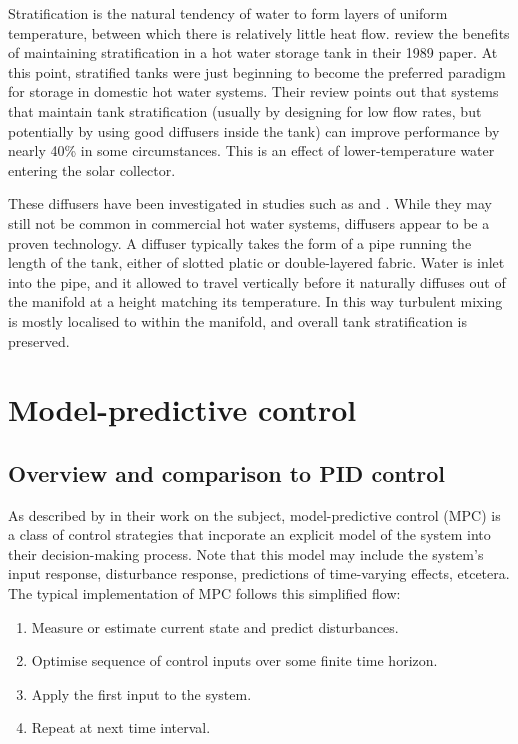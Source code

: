 Stratification is the natural tendency of water to form layers of uniform temperature, between which there is relatively little heat flow.
\textcite{Hollands89} review the benefits of maintaining stratification in a hot water storage tank in their 1989 paper.
At this point, stratified tanks were just beginning to become the preferred paradigm for storage in domestic hot water systems.
Their review points out that systems that maintain tank stratification (usually by designing for low flow rates, but potentially by using good diffusers inside the tank) can improve performance by nearly 40\% in some circumstances.
This is an effect of lower-temperature water entering the solar collector.

These diffusers have been investigated in studies such as \textcite{Andersen08} and \textcite{Gari82}.
While they may still not be common in commercial hot water systems, diffusers appear to be a proven technology.
A diffuser typically takes the form of a pipe running the length of the tank, either of slotted platic or double-layered fabric.
Water is inlet into the pipe, and it allowed to travel vertically before it naturally diffuses out of the manifold at a height matching its temperature.
In this way turbulent mixing is mostly localised to within the manifold, and overall tank stratification is preserved.


\section{Model-predictive control}

\subsection{Overview and comparison to PID control}

As described by \textcite{Camacho04} in their work on the subject, model-predictive control (MPC) is a class of control strategies that incporate an explicit model of the system into their decision-making process.
Note that this model may include the system's input response, disturbance response, predictions of time-varying effects, etcetera.
The typical implementation of MPC follows this simplified flow:

\begin{enumerate}
   \item Measure or estimate current state and predict disturbances.
   \item Optimise sequence of control inputs over some finite time horizon.
   \item Apply the first input to the system.
   \item Repeat at next time interval.
\end{enumerate}

